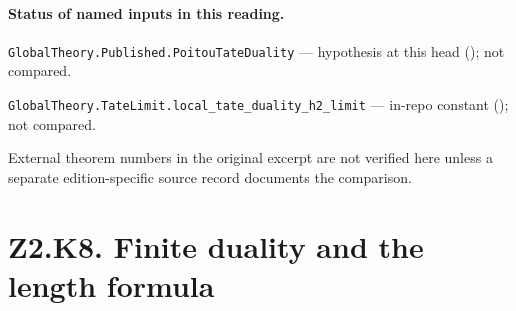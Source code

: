 
\paragraph{Status of named inputs in this reading.}
\noindent\nolinkurl{GlobalTheory.Published.PoitouTateDuality} --- hypothesis at this head (); not compared.\par
\noindent\nolinkurl{GlobalTheory.TateLimit.local_tate_duality_h2_limit} --- in-repo constant (); not compared.\par
External theorem numbers in the original excerpt are not verified here unless a separate edition-specific source record documents the comparison.

\section*{Z2.K8. Finite duality and the length formula}

